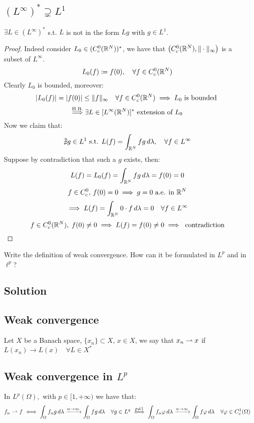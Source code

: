 \subsection{\texorpdfstring{$(L^\infty)^* \supsetneq L^1$}{The dual of L infinity is strictly bigger than L1}}
$\exists L \in (L^\infty)^* $ s.t. $L $ is not in the form $Lg$ with $g\in L^1$.
\begin{proof}
Indeed consider $L_0 \in (C_c^0 (\mathbb{R}^N))^*$, we have 
 that $\big(C_c^0 (\mathbb{R}^N),\|\cdot\|_\infty\big)$ is a subset of $L^\infty$.
 \[L_0(f)\coloneqq f(0),\quad \forall f \in C_c^0 (\mathbb{R}^N)\]
Clearly $L_0$ is bounded, moreover:
 \[
 |L_0(f)| = |f(0)|  \le \|f\|_\infty\quad \forall f \in C_c^0 (\mathbb{R}^N) \implies L_0 \text{ is bounded }
 \]
\[
\overset{\text{H.B.}}{\Longrightarrow} \exists L \in [L^\infty(\mathbb{R}^N)]^* \text{ extension of } L_0
\]
Now we claim that:
\[
\nexists g \in L^1 \mbox{ s.t. } L(f)=\int_{\mathbb{R}^N}fg\,d\lambda,\quad \forall f \in L^\infty
\]    
Suppose by contradiction that such a $g$ exists, then:
\[
L(f)=L_0(f) = \int_{\mathbb{R}^N}fg\,d\lambda = f(0) = 0 
\]
\[
f \in C_c^0,\,f(0)=0 \implies g =0 \text{ a.e. in } \mathbb{R}^N
\]
\[
\implies L(f) = \int_{\mathbb{R}^N}0\cdot f\,d\lambda = 0\quad \forall f \in L^\infty
\]
\[
 f \in C_c^0 (\mathbb{R}^N),\; f(0) \neq 0 \implies L(f)=f(0)\neq 0 \implies \text{ contradiction}
\]

\end{proof}


\question
Write the definition of weak convergence. How can it be formulated in $L^p$ and in $\ell^p$?

\subsection*{Solution}

\subsection{Weak convergence}
Let $X $ be a Banach space, $\{x_n\} \subset X$, $x\in X$, we say that $x_n \rightharpoonup x$ if $L(x_n) \to L(x) \quad \forall L\in X^*$

\subsection{Weak convergence in \texorpdfstring{$L^p$}{Lp}}
In $L^p(\Omega),\text{ with }p\in[1,+\infty) $ we have that:
\[
f_n \rightharpoonup f \iff \int_\Omega f_n g\,d\lambda \xrightarrow{n\to\infty} \int_\Omega f g\,d\lambda  \quad\forall g \in L^q \overset{p\neq 1}{\iff} \int_\Omega f_n \varphi\,d\lambda \xrightarrow{n\to\infty} \int_\Omega f \varphi\,d\lambda \quad\forall \varphi \in C^1_c(\Omega) 
\]

